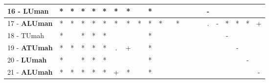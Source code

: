 \begin{table}[h]
\begin{center}
\begin{tabular}{lcc|cc|cc|cc|cc|cc|cc|cc|cc|cc|c}
16 - \textbf{LUman}	& * & * & * & * & * & * & * &   & * &   &   &   &   &   &   & - &   &   &   &   &   \\ \hline
17 - \textbf{ALUman}	& * & * & * & * & * & * & * & * & * & * &   & * &   &   &   & . & - & * & * & * & + \\
18 - TUmah	& * &   & * & * & * &   &   &   & * &   &   &   &   &   &   &   &   & - &   &   &   \\ \hline
19 - \textbf{ATUmah}	& * & * & * & * & * & . & + &   & * &   &   &   &   &   &   &   &   &   & - &   &   \\
20 - \textbf{LUmah}	& * &   & * & * & * &   &   &   & * &   &   &   &   &   &   &   &   &   &   & - &   \\ \hline
21 - \textbf{ALUmah}	& * & * & * & * & * & + & * &   & * &   &   &   &   &   &   &   &   &   &   &   & - \\\end{tabular}
\label{stratsALCKappaFriedC4.5}
\end{center}
\end{table}